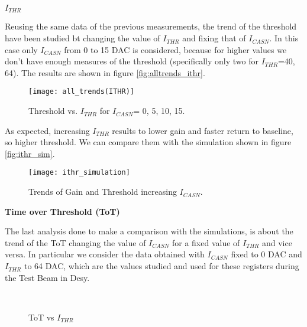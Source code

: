 \begin{description}
\item[\textbf{$I_{THR}$}]
\end{description}

Reusing the same data of the previous measurements, the trend of the threshold have been studied bt changing the value of $I_{THR}$ and fixing that of $I_{CASN}$. In this case only $I_{CASN}$ from 0 to 15 DAC is considered, because for higher values we don't have enough measures of the threshold (specifically only two for $I_{THR}$=40, 64). The results are shown in figure \vref{fig:alltrends_ithr}.

\begin{figure}[h!]
\centering
\texttt{[image: all\_trends(ITHR)]}
\caption{Threshold vs. $I_{THR}$ for $I_{CASN}$= 0, 5, 10, 15.}
\label{fig:alltrends_ithr}
\end{figure}

As expected, increasing $I_{THR}$ results to lower gain and faster return to baseline, so higher threshold. 
We can compare them with the simulation shown in figure \vref{fig:ithr_sim}. 

\begin{figure}[h!]
\centering
\texttt{[image: ithr\_simulation]}
\caption{Trends of Gain and Threshold increasing $I_{CASN}$.}
\label{fig:ithr_sim}
\end{figure}

\begin{description}
\item[\textbf{Time over Threshold (ToT)}]
\end{description}

The last analysis done to make a comparison with the simulations, is about the trend of the ToT changing the value of $I_{CASN}$ for a fixed value of $I_{THR}$ and vice versa. In particular we consider the data obtained with $I_{CASN}$ fixed to 0 DAC and $I_{THR}$ to 64 DAC, which are the values studied and used for these registers during the Test Beam in Desy.

\begin{figure}[h!]
\centering
{}\quad
{}\\
\caption{ToT vs $I_{THR}$}
\label{fig:tot_vs_ithr}
\end{figure}

